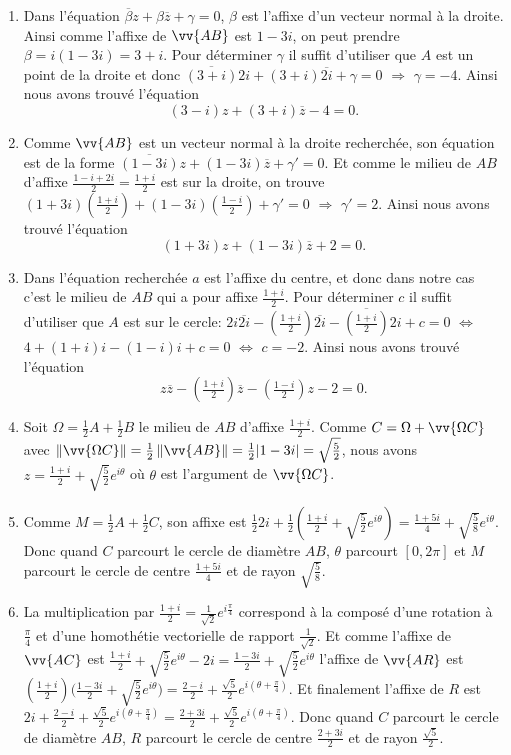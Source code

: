 \documentclass[a4paper,12pt,reqno]{amsart}
\begin{document}
\begin{solution}
  \begin{enumerate}
    \item Dans l'équation $\overline{\beta}z+\beta\overline{z}+\gamma=0$, $\beta$ est l'affixe d'un vecteur normal à la droite. Ainsi comme l'affixe de $\vv{AB}$ est $1-3i$, on peut prendre $\beta = i(1-3i) = 3+i$. Pour déterminer $\gamma$ il suffit d'utiliser que $A$ est un point de la droite et donc $\overline{(3+i)}2i+(3+i)\overline{2i}+\gamma=0$ $\Longrightarrow$ $\gamma = -4$. Ainsi nous avons trouvé l'équation
    $$
      (3-i)z + (3+i)\overline{z} - 4 = 0.
    $$
    \item Comme $\vv{AB}$ est un vecteur normal à la droite recherchée, son équation est de la forme $\overline{(1-3i)}z+(1-3i)\overline{z}+\gamma'=0$. Et comme le milieu de $AB$ d'affixe $\frac{1-i+2i}{2}=\frac{1+i}{2}$ est sur la droite, on trouve $(1+3i)(\frac{1+i}{2})+(1-3i)(\frac{1-i}{2})+\gamma'=0$ $\Longrightarrow$ $\gamma' = 2$. Ainsi nous avons trouvé l'équation
    $$
      (1+3i)z + (1-3i)\overline{z} + 2 = 0.
    $$
    \item Dans l'équation recherchée $a$ est l'affixe du centre, et donc dans notre cas c'est le milieu de $AB$ qui a pour affixe $\frac{1+i}{2}$. Pour déterminer $c$ il suffit d'utiliser que $A$ est sur le cercle: $2i\overline{2i}-(\frac{1+i}{2})\overline{2i}-\overline{(\frac{1+i}{2})}2i+c=0$ $\Leftrightarrow$ $4+(1+i)i-(1-i)i+c=0$ $\Leftrightarrow$ $c=-2$. Ainsi nous avons trouvé l'équation
    $$
      z\overline{z}-(\tfrac{1+i}{2})\overline{z}-(\tfrac{1-i}{2})z-2=0.
    $$
    \item Soit $\Omega=\frac{1}{2}A+\frac{1}{2}B$ le milieu de $AB$ d'affixe $\frac{1+i}{2}$. Comme $C=\Omega +\vv{\Omega C}$ avec $\norm{\vv{\Omega C}}=\frac{1}{2}\norm{\vv{AB}}=\frac{1}{2}|1-3i|=\sqrt{\frac{5}{2}}$, nous avons $z=\frac{1+i}{2}+\sqrt{\frac{5}{2}}e^{i\theta}$ où $\theta$ est l'argument de $\vv{\Omega C}$.
    \item Comme $M=\frac{1}{2}A+\frac{1}{2}C$, son affixe est $\frac{1}{2}2i+\frac{1}{2}(\frac{1+i}{2}+\sqrt{\frac{5}{2}}e^{i\theta})=\frac{1+5i}{4}+\sqrt{\frac{5}{8}}e^{i\theta}$. Donc quand $C$ parcourt le cercle de diamètre $AB$, $\theta$ parcourt $[0,2\pi]$ et $M$ parcourt le cercle de centre $\frac{1+5i}{4}$ et de rayon $\sqrt{\frac{5}{8}}$.
    \item La multiplication par $\frac{1+i}{2}=\frac{1}{\sqrt{2}}e^{i\frac{\pi}{4}}$ correspond à la composé d'une rotation à $\frac{\pi}{4}$ et d'une homothétie vectorielle de rapport $\frac{1}{\sqrt{2}}$. Et comme l'affixe de $\vv{AC}$ est $\frac{1+i}{2}+\sqrt{\frac{5}{2}}e^{i\theta}-2i=\frac{1-3i}{2}+\sqrt{\frac{5}{2}}e^{i\theta}$ l'affixe de $\vv{AR}$ est $(\frac{1+i}{2})\big(\frac{1-3i}{2}+\sqrt{\frac{5}{2}}e^{i\theta}\big)=\frac{2-i}{2}+\frac{\sqrt{5}}{2}e^{i(\theta+\frac{\pi}{4})}$. Et finalement l'affixe de $R$ est $2i+\frac{2-i}{2}+\frac{\sqrt{5}}{2}e^{i(\theta+\frac{\pi}{4})}=\frac{2+3i}{2}+\frac{\sqrt{5}}{2}e^{i(\theta+\frac{\pi}{4})}$. Donc quand $C$ parcourt le cercle de diamètre $AB$, $R$ parcourt le cercle de centre $\frac{2+3i}{2}$ et de rayon $\frac{\sqrt{5}}{2}$.

\end{enumerate}
\end{solution}
\end{document}
